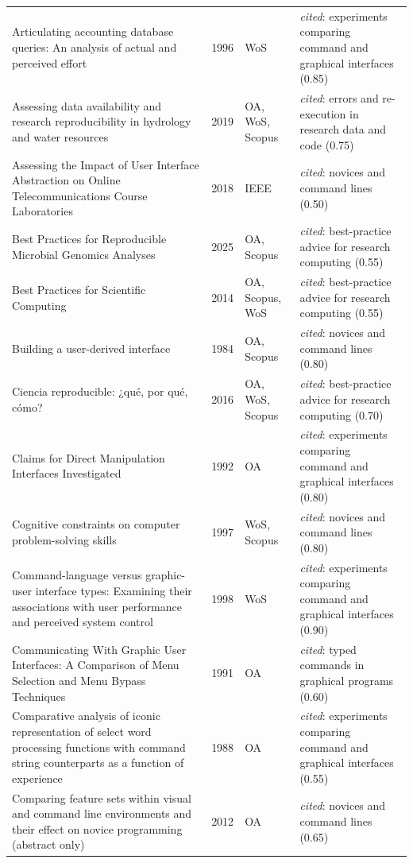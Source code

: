 \begin{longtable}{@{}%
  >{\raggedright\arraybackslash}p{}c%
  >{\raggedright\arraybackslash}p{}%
  >{\raggedright\arraybackslash}p{}@{}}
Articulating accounting database queries: An analysis of actual and perceived effort & 1996 & WoS & \emph{cited}: experiments comparing command and graphical interfaces (0.85) \\
Assessing data availability and research reproducibility in hydrology and water resources & 2019 & OA, WoS, Scopus & \emph{cited}: errors and re-execution in research data and code (0.75) \\
Assessing the Impact of User Interface Abstraction on Online Telecommunications Course Laboratories & 2018 & IEEE & \emph{cited}: novices and command lines (0.50) \\
Best Practices for Reproducible Microbial Genomics Analyses & 2025 & OA, Scopus & \emph{cited}: best-practice advice for research computing (0.55) \\
Best Practices for Scientific Computing & 2014 & OA, Scopus, WoS & \emph{cited}: best-practice advice for research computing (0.55) \\
Building a user-derived interface & 1984 & OA, Scopus & \emph{cited}: novices and command lines (0.80) \\
Ciencia reproducible: ¿qué, por qué, cómo? & 2016 & OA, WoS, Scopus & \emph{cited}: best-practice advice for research computing (0.70) \\
Claims for Direct Manipulation Interfaces Investigated & 1992 & OA & \emph{cited}: experiments comparing command and graphical interfaces (0.80) \\
Cognitive constraints on computer problem-solving skills & 1997 & WoS, Scopus & \emph{cited}: novices and command lines (0.80) \\
Command-language versus graphic-user interface types: Examining their associations with user performance and perceived system control & 1998 & WoS & \emph{cited}: experiments comparing command and graphical interfaces (0.90) \\
Communicating With Graphic User Interfaces: A Comparison of Menu Selection and Menu Bypass Techniques & 1991 & OA & \emph{cited}: typed commands in graphical programs (0.60) \\
Comparative analysis of iconic representation of select word processing functions with command string counterparts as a function of experience & 1988 & OA & \emph{cited}: experiments comparing command and graphical interfaces (0.55) \\
Comparing feature sets within visual and command line environments and their effect on novice programming (abstract only) & 2012 & OA & \emph{cited}: novices and command lines (0.65) \\

\end{longtable}

